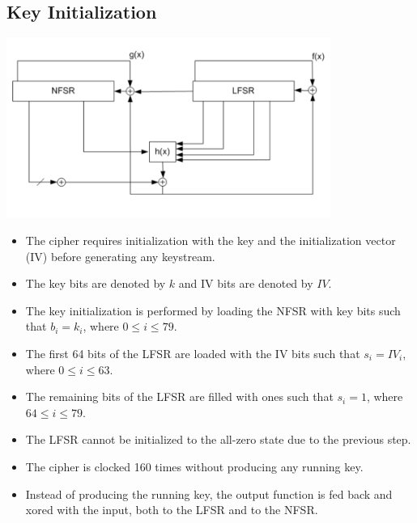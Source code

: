 \documentclass[11pt]{article}
\begin{document}
\subsection*{Key Initialization}
\begin{center}
\includegraphics[width=300pt]{p2.png}
\end{center}
\begin{itemize} 
\itemsep 0em
\item The cipher requires initialization with the key and the initialization vector (IV) before generating any keystream.
\item The key bits are denoted by $k$ and IV bits are denoted by $IV$.
\item The key initialization is performed by loading the NFSR with key bits such that $b_i = k_i$, where $0 \leq i \leq 79$.
\item The first 64 bits of the LFSR are loaded with the IV bits such that $s_i = IV_i$, where $0 \leq i \leq 63$.
\item The remaining bits of the LFSR are filled with ones such that $s_i = 1$, where $64 \leq i \leq 79$.
\item The LFSR cannot be initialized to the all-zero state due to the previous step.
\item The cipher is clocked 160 times without producing any running key.
\item Instead of producing the running key, the output function is fed back and xored with the input, both to the LFSR and to the NFSR.
\end{itemize}
\end{document}
